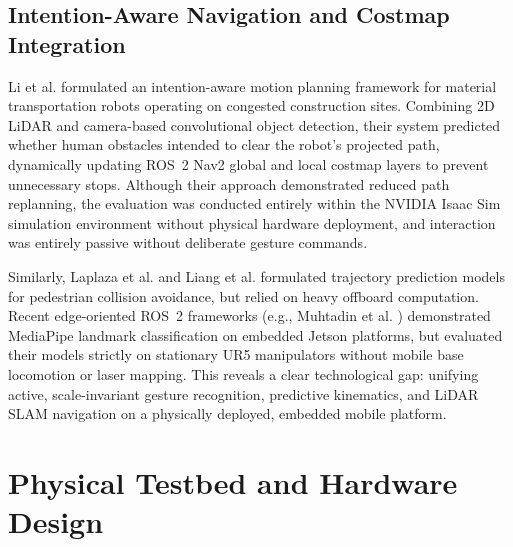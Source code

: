 \documentclass[journal]{IEEEtran}
\begin{document}
\subsection{Intention-Aware Navigation and Costmap Integration}
Li et al. \cite{li2023} formulated an intention-aware motion planning framework for material transportation robots operating on congested construction sites. Combining 2D LiDAR and camera-based convolutional object detection, their system predicted whether human obstacles intended to clear the robot's projected path, dynamically updating ROS~2 Nav2 global and local costmap layers to prevent unnecessary stops. Although their approach demonstrated reduced path replanning, the evaluation was conducted entirely within the NVIDIA Isaac Sim simulation environment without physical hardware deployment, and interaction was entirely passive without deliberate gesture commands.

Similarly, Laplaza et al. \cite{laplaza2022} and Liang et al. \cite{liang2024} formulated trajectory prediction models for pedestrian collision avoidance, but relied on heavy offboard computation. Recent edge-oriented ROS~2 frameworks (e.g., Muhtadin et al. \cite{muhtadin2025}) demonstrated MediaPipe landmark classification on embedded Jetson platforms, but evaluated their models strictly on stationary UR5 manipulators without mobile base locomotion or laser mapping. This reveals a clear technological gap: unifying active, scale-invariant gesture recognition, predictive kinematics, and LiDAR SLAM navigation on a physically deployed, embedded mobile platform.

\section{Physical Testbed and Hardware Design}
\end{document}
